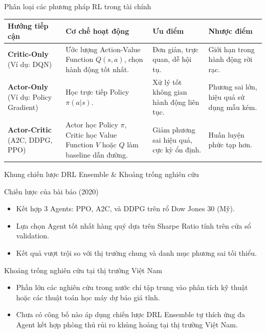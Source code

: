 \documentclass[10pt,aspectratio=169]{beamer}
\begin{document}
\begin{frame}{Phân loại các phương pháp RL trong tài chính}
  \begin{table}[h]
    \centering
    \small
    \begin{tabular}{p{2.8cm}p{4cm}p{4cm}p{2.8cm}}
      \toprule
      \textbf{Hướng tiếp cận} & \textbf{Cơ chế hoạt động} & \textbf{Ưu điểm} & \textbf{Nhược điểm} \\
      \midrule
      \textbf{Critic-Only} \newline (Ví dụ: DQN) & Ước lượng Action-Value Function $Q(s, a)$, chọn hành động tốt nhất. & Đơn giản, trực quan, dễ hội tụ. & Giới hạn trong hành động rời rạc. \\
      \midrule
      \textbf{Actor-Only} \newline (Ví dụ: Policy Gradient) & Học trực tiếp Policy $\pi(a|s)$. & Xử lý tốt không gian hành động liên tục. & Phương sai lớn, hiệu quả sử dụng mẫu kém. \\
      \midrule
      \rowcolor{lightgray} \textbf{Actor-Critic} \newline (A2C, DDPG, PPO) & Actor học Policy $\pi$, Critic học Value Function $V$ hoặc $Q$ làm baseline dẫn đường. & Giảm phương sai hiệu quả, cực kỳ ổn định. & Huấn luyện phức tạp hơn. \\
      \bottomrule
    \end{tabular}
  \end{table}
\end{frame}

\begin{frame}{Khung chiến lược DRL Ensemble \& Khoảng trống nghiên cứu}
  \begin{block}{Chiến lược của bài báo (2020)}
    \begin{itemize}
      \item Kết hợp 3 Agents: PPO, A2C, và DDPG trên rổ Dow Jones 30 (Mỹ).
      \item Lựa chọn Agent tốt nhất hàng quý dựa trên Sharpe Ratio tính trên cửa sổ validation.
      \item Kết quả vượt trội so với thị trường chung và danh mục phương sai tối thiểu.
    \end{itemize}
  \end{block}
  \vspace{0.2cm}
  \begin{alertblock}{Khoảng trống nghiên cứu tại thị trường Việt Nam}
    \begin{itemize}
      \item Phần lớn các nghiên cứu trong nước chỉ tập trung vào phân tích kỹ thuật hoặc các thuật toán học máy dự báo giá tĩnh.
      \item Chưa có công bố nào áp dụng chiến lược DRL Ensemble tự thích ứng đa Agent kết hợp phòng thủ rủi ro khủng hoảng tại thị trường Việt Nam.
    \end{itemize}
  \end{alertblock}
\end{frame}
\end{document}
